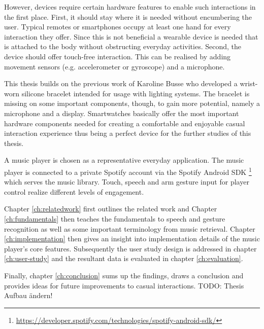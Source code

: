 However, devices require certain hardware features to enable such interactions in the first place. First, it should stay where it is needed without encumbering the user. Typical remotes or smartphones occupy at least one hand for every interaction they offer. Since this is not beneficial a wearable device is needed that is attached to the body without obstructing everyday activities.
Second, the device should offer touch-free interaction. This can be realised by adding movement sensors (e.g. accelerometer or gyroscope) and a microphone.\cite{Busse2014Thesis}

This thesis builds on the previous work of Karoline Busse \cite{Busse2014Thesis} who developed a wrist-worn silicone bracelet intended for usage with lighting systems. The bracelet is missing on some important components, though, to gain more potential, namely a microphone and a display. Smartwatches basically offer the most important hardware components needed for creating a comfortable and enjoyable casual interaction experience thus being a perfect device for the further studies of this thesis.

A music player is chosen as a representative everyday application. The music player is connected to a private Spotify account via the Spotify Android \ac{SDK} \footnote{\url{https://developer.spotify.com/technologies/spotify-android-sdk/}} which serves the music library. Touch, speech and arm gesture input for player control realize different levels of engagement.

Chapter \ref{ch:relatedwork} first outlines the related work and Chapter \ref{ch:fundamentals} then teaches the fundamentals to speech and gesture recognition as well as some important terminology from music retrieval. Chapter \ref{ch:implementation} then gives an insight into implementation details of the music player's core features. Subsequently the user study design is addressed in chapter \ref{ch:user-study} and the resultant data is evaluated in chapter \ref{ch:evaluation}.

Finally, chapter \ref{ch:conclusion} sums up the findings, draws a conclusion and provides ideas for future improvements to casual interactions.
TODO: Thesis Aufbau ändern!







